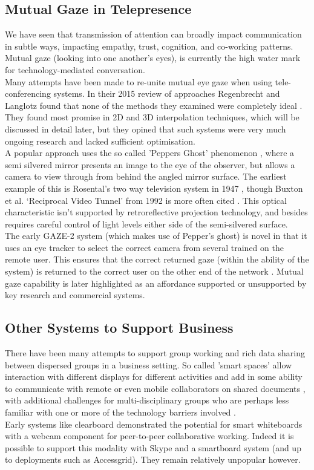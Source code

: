                    \subsection{Mutual Gaze in Telepresence}
          We have seen that transmission of attention can broadly impact communication in subtle ways, impacting empathy, trust, cognition, and co-working patterns. Mutual gaze (looking into one another's eyes), is currently the high water mark for technology-mediated conversation.\\
          Many attempts have been made to re-unite mutual eye gaze when using tele-conferencing systems. In their 2015 review of approaches Regenbrecht and Langlotz found that none of the methods they examined were completely ideal \cite{Regenbrecht2015}. They found most promise in 2D and 3D interpolation techniques, which will be discussed in detail later, but they opined that such systems were very much ongoing research and lacked sufficient optimisation.\\
          A popular approach uses the so called 'Peppers Ghost' phenomenon \cite{steinmeyer2013science}, where a semi silvered mirror presents an image to the eye of the observer, but allows a camera to view through from behind the angled mirror surface. The earliest example of this is Rosental's two way television system in 1947 \cite{rosenthal1947two}, though Buxton et al. `Reciprocal Video Tunnel' from 1992 is more often cited \cite{buxton1992telepresence}. This optical characteristic isn't supported by retroreflective projection technology, and besides requires careful control of light levels either side of the semi-silvered surface.\\  
The early GAZE-2 system (which makes use of Pepper's ghost) is novel in that it uses an eye tracker to select the correct camera from several trained on the remote user. This ensures that the correct returned gaze (within the ability of the system) is returned to the correct user on the other end of the network \cite{Vertegaal2003}.
Mutual gaze capability is later highlighted as an affordance supported or unsupported by key research and commercial systems.                           
\subsection{Other Systems to Support Business}                  
There have been many attempts to support group working and rich data sharing between dispersed groups in a business setting. So called 'smart spaces' allow interaction with different displays for different activities and add in some ability to communicate with remote or even mobile collaborators on shared documents \cite{Bardram2012}, with additional challenges for multi-disciplinary groups who are perhaps less familiar with one or more of the technology barriers involved \cite{Adamczyk2007}.\\
Early systems like clearboard \cite{Ishii1993} demonstrated the potential for smart whiteboards with a webcam component for peer-to-peer collaborative working. Indeed it is possible to support this modality with Skype and a smartboard system (and up to deployments such as Accessgrid). They remain relatively unpopular however.\\
